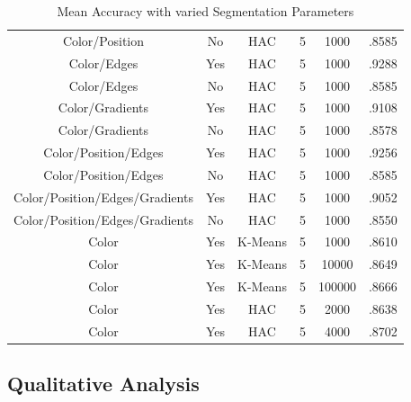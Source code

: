 \documentclass[12pt]{article}
\begin{document}
\begin{table}[H]
\begin{adjustbox}{width=\columnwidth,center}
\begin{tabular}{c c c c c c}
			Color/Position & No & HAC & 5 & 1000 & .8585 \\
			Color/Edges & Yes & HAC & 5 & 1000 & .9288 \\
			Color/Edges & No & HAC & 5 & 1000 & .8585 \\
			Color/Gradients & Yes & HAC & 5 & 1000 & .9108 \\
			Color/Gradients & No & HAC & 5 & 1000 & .8578 \\
			Color/Position/Edges & Yes & HAC & 5 & 1000 & .9256 \\
			Color/Position/Edges & No & HAC & 5 & 1000 & .8585 	\\
			Color/Position/Edges/Gradients & Yes & HAC & 5 & 1000 & .9052 \\
			Color/Position/Edges/Gradients & No & HAC & 5 & 1000 & .8550 \\
			Color & Yes & K-Means & 5 & 1000 & .8610 \\
			Color & Yes & K-Means & 5 & 10000 & .8649 \\
			Color & Yes & K-Means & 5 & 100000 & .8666 \\
			Color & Yes & HAC & 5 & 2000 & .8638 \\
			Color & Yes & HAC & 5 & 4000 & .8702 \\ \hline
		\end{tabular}
	\end{adjustbox}
	\caption{Mean Accuracy with varied Segmentation Parameters}
\end{table}

\subsection{Qualitative Analysis}
\end{document}
